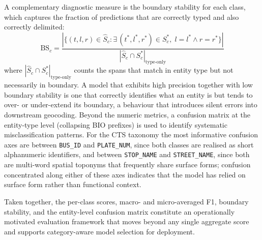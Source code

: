 A complementary diagnostic measure is the boundary stability for each class, which captures the fraction of predictions that are correctly typed and also correctly delimited:
\begin{equation}
  \text{BS}_c = \frac{|\{(t, l, r) \in \hat{S}_c : \exists\, (t^*, l^*, r^*) \in S^*_c,\; l = l^* \wedge r = r^*\}|}{|\hat{S}_c \cap S^*_c|_{\text{type-only}}}
\end{equation}
where $|\hat{S}_c \cap S^*_c|_{\text{type-only}}$ counts the spans that match in entity type but not necessarily in boundary. A model that exhibits high precision together with low boundary stability is one that correctly identifies what an entity is but tends to over- or under-extend its boundary, a behaviour that introduces silent errors into downstream geocoding. Beyond the numeric metrics, a confusion matrix at the entity-type level (collapsing BIO prefixes) is used to identify systematic misclassification patterns. For the CTS taxonomy the most informative confusion axes are between \texttt{BUS\_ID} and \texttt{PLATE\_NUM}, since both classes are realised as short alphanumeric identifiers, and between \texttt{STOP\_NAME} and \texttt{STREET\_NAME}, since both are multi-word spatial toponyms that frequently share surface forms; confusion concentrated along either of these axes indicates that the model has relied on surface form rather than functional context.

Taken together, the per-class scores, macro- and micro-averaged F1, boundary stability, and the entity-level confusion matrix constitute an operationally motivated evaluation framework that moves beyond any single aggregate score and supports category-aware model selection for deployment.